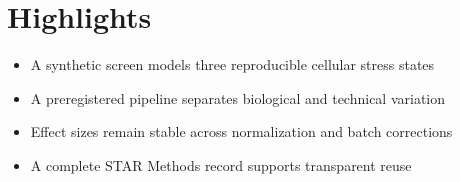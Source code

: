 \section{Highlights}
\begin{itemize}[leftmargin=1.4em,itemsep=0.15em,topsep=0.2em]
  \item A synthetic screen models three reproducible cellular stress states
  \item A preregistered pipeline separates biological and technical variation
  \item Effect sizes remain stable across normalization and batch corrections
  \item A complete STAR Methods record supports transparent reuse
\end{itemize}
